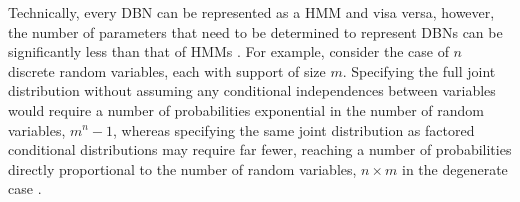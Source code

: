 Technically, every DBN can be represented as a HMM and visa versa, however, the number of parameters that need to be determined to represent DBNs can be significantly less than that of HMMs \cite{KollerPGM}. For example, consider the case of $n$ discrete random variables, each with support of size $m$. Specifying the full joint distribution without assuming any conditional independences between variables would require a number of probabilities exponential in the number of random variables, $m^{n}-1$, whereas specifying the same joint distribution as factored conditional distributions may require far fewer, reaching a number of probabilities directly proportional to the number of random variables, $n \times m$ in the degenerate case \cite[p.~63]{KollerPGM}. 

